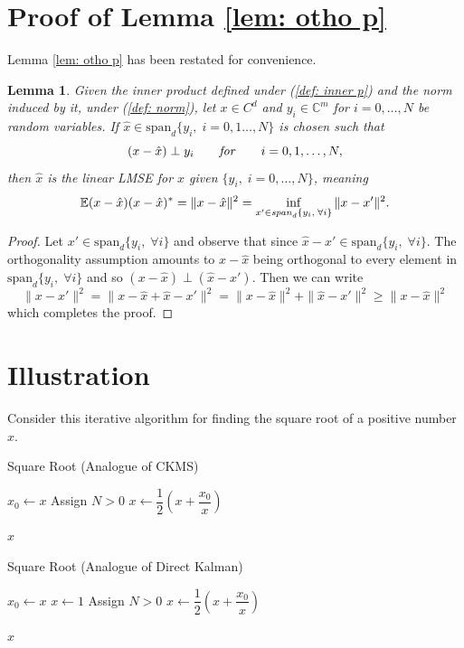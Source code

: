 \documentclass[12pt]{amsart}
\newcommand{\E}{\mathbb{E}}
\newcommand{\C}{\mathbb{C}}
\newtheorem*{lem}{Lemma}
\begin{document}
\section{Proof of Lemma \ref{lem: otho p}}
\label{app: Ortho proof}
Lemma \ref{lem: otho p} has been restated for convenience.
\begin{lem}
	Given the inner product defined under (\ref{def: inner p}) and the norm induced by it, under (\ref{def: norm}), let $x\in C^d$ and $y_i \in \C^m$ for $i=0,\dots,N$ be random variables. If $\hat x\in \text{span}_d\{y_i,\;i=0,1\dots,N\}$ is chosen such that \begin{equation}
	(x-\hat x) \perp y_i \qquad\text{\emph{for}}\qquad i=0,1,\dots,N,
	\end{equation}
	then $\hat x$ is the linear LMSE for $x$ given $\{y_i,\;i=0,\dots,N\}$, meaning
	$$\E(x-\hat x)(x-\hat x)^* = \|x-\hat x\|^2 = \inf_{x'\in \text{\emph{span}}_d\{y_i,\;\forall i\}} \|x-x'\|^2.$$
\end{lem}
\begin{proof}
	Let $x' \in \text{span}_d\{y_i,\;\forall i\}$ and observe that since $\hat x - x' \in \text{span}_d\{y_i,\;\forall i\}$. The orthogonality assumption amounts to $x-\hat x$ being orthogonal to every element in $\text{span}_d\{y_i,\;\forall i\}$ and so $(x-\hat x) \perp (\hat x - x')$. Then we can write
	$$\|x-x'\|^2 = \|x-\hat x + \hat x - x'\|^2 = \|x-\hat x \|^2 + \|\hat x - x'\|^2 \ge \|x-\hat x \|^2$$
	which completes the proof.
\end{proof}




\section{Illustration}
Consider this iterative algorithm for finding the square root of a positive number $x$. 

\begin{algorithm}
	\caption{Square Root (Analogue of CKMS)}
	\label{alg: sqrt CKMS}
	\begin{algorithmic}[1]
		\State $x_0 \gets x$
		\State Assign $N>0$
		\State	$x \gets \dfrac{1}{2}\left(x+\dfrac{x_0}{x}\right)$
		\EndFor
		\item[]
		\Return $x$		
		\EndProcedure
	\end{algorithmic}	
\end{algorithm}

\begin{algorithm}
	\caption{Square Root (Analogue of Direct Kalman)}
	\label{alg: sqrt Kalman}
	\begin{algorithmic}[1]
		\State $x_0 \gets x$
		\State $x \gets 1$
		\State Assign $N>0$
		\State	$x \gets \dfrac{1}{2}\left(x+\dfrac{x_0}{x}\right)$
		\EndFor
		\item[]
		\Return $x$		
		\EndProcedure
	\end{algorithmic}	
\end{algorithm}



\end{document}
